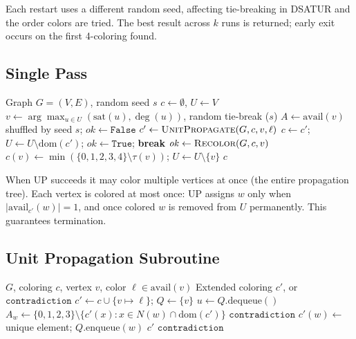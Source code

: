 \documentclass[11pt,twocolumn]{article}
\begin{document}
Each restart uses a different random seed, affecting tie-breaking in
DSATUR and the order colors are tried.  The best result across $k$ runs
is returned; early exit occurs on the first 4-coloring found.

\subsection{Single Pass}

\begin{algorithm}[t]
\caption{SingleRun}
\label{alg:single}
\begin{algorithmic}[1]
\Require Graph $G=(V,E)$, random seed $s$
\State $c\gets\emptyset$, \;$U\gets V$ 
  \State $v\gets\arg\max_{u\in U}(\mathrm{sat}(u),\deg(u))$, random tie-break ($s$)
  \State $A\gets\mathrm{avail}(v)$ shuffled by seed $s$; $\mathit{ok}\gets\mathtt{False}$
    \State $c'\gets\Call{UnitPropagate}{G,c,v,\ell}$
      \State $c\gets c'$;\; $U\gets U\setminus\mathrm{dom}(c')$;\;
             $\mathit{ok}\gets\mathtt{True}$;\; \textbf{break}
    \EndIf
  \EndFor
    \State $\mathit{ok}\gets\Call{Recolor}{G,c,v}$
  \EndIf
    \State $c(v)\gets\min(\{0,1,2,3,4\}\setminus\tau(v))$;\; $U\gets U\setminus\{v\}$
  \EndIf
\EndWhile
\State \Return $c$
\end{algorithmic}
\end{algorithm}

When UP succeeds it may color multiple vertices at once (the entire
propagation tree).  Each vertex is colored at most once: UP assigns $w$
only when $|\mathrm{avail}_{c'}(w)|=1$, and once colored $w$ is removed
from $U$ permanently.  This guarantees termination.

\subsection{Unit Propagation Subroutine}

\begin{algorithm}[t]
\caption{UnitPropagate}
\label{alg:up}
\begin{algorithmic}[1]
\Require $G$, coloring $c$, vertex $v$, color $\ell\in\mathrm{avail}(v)$
\Ensure Extended coloring $c'$, or $\mathtt{contradiction}$
\State $c'\gets c\cup\{v\mapsto\ell\}$;\; $Q\gets\{v\}$
  \State $u\gets Q.\mathrm{dequeue}()$
    \State $A_w\gets\{0,1,2,3\}\setminus\{c'(x):x\in N(w)\cap\mathrm{dom}(c')\}$
     \Return $\mathtt{contradiction}$
     $c'(w)\gets$ unique element;\; $Q.\mathrm{enqueue}(w)$
    \EndIf
  \EndFor
\EndWhile
{}
  \Return $c'$ \Else{} \Return $\mathtt{contradiction}$ \EndIf
\end{algorithmic}
\end{algorithm}
\end{document}
